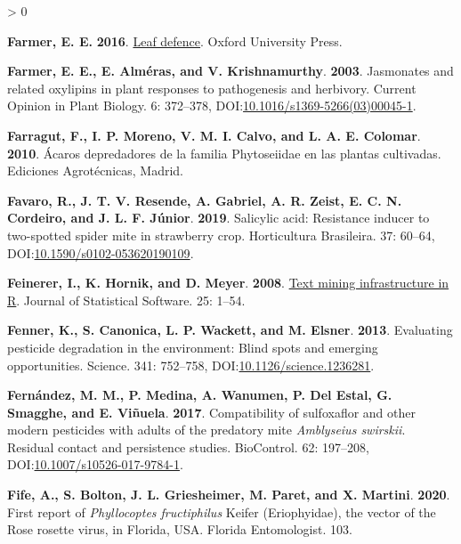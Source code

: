 \documentclass{ufdissertation}[overrideChapters] %
\newlength{\cslhangindent}
\newenvironment{CSLReferences}[2] %
 {%
  \setlength{\parindent}{0pt}
  \ifodd #1 \everypar{\setlength{\hangindent}{\cslhangindent}}\ignorespaces\fi
  \ifnum #2 > 0
  \setlength{\parskip}{#2\baselineskip}
  \fi
 }%
 {}
\begin{document}
{\begin{CSLReferences}{1}{1}
\leavevmode{}%
\textbf{Farmer, E. E.} \textbf{2016}. \href{https://www.ebook.de/de/product/28782938/edward_e_farmer_leaf_defence.html}{Leaf defence}. Oxford University Press.

\leavevmode{}%
\textbf{Farmer, E. E., E. Alméras, and V. Krishnamurthy}. \textbf{2003}. Jasmonates and related oxylipins in plant responses to pathogenesis and herbivory. Current Opinion in Plant Biology. 6: 372--378, DOI:\href{https://doi.org/10.1016/s1369-5266(03)00045-1}{10.1016/s1369-5266(03)00045-1}.

\leavevmode{}%
\textbf{Farragut, F., I. P. Moreno, V. M. I. Calvo, and L. A. E. Colomar}. \textbf{2010}. {Á}caros depredadores de la familia {Phytoseiidae} en las plantas cultivadas. Ediciones Agrot{é}cnicas, Madrid.

\leavevmode{}%
\textbf{Favaro, R., J. T. V. Resende, A. Gabriel, A. R. Zeist, E. C. N. Cordeiro, and J. L. F. Júnior}. \textbf{2019}. Salicylic acid: Resistance inducer to two-spotted spider mite in strawberry crop. Horticultura Brasileira. 37: 60--64, DOI:\href{https://doi.org/10.1590/s0102-053620190109}{10.1590/s0102-053620190109}.

\leavevmode{}%
\textbf{Feinerer, I., K. Hornik, and D. Meyer}. \textbf{2008}. \href{https://www.jstatsoft.org/v25/i05/}{Text mining infrastructure in {R}}. Journal of Statistical Software. 25: 1--54.

\leavevmode{}%
\textbf{Fenner, K., S. Canonica, L. P. Wackett, and M. Elsner}. \textbf{2013}. Evaluating pesticide degradation in the environment: Blind spots and emerging opportunities. Science. 341: 752--758, DOI:\href{https://doi.org/10.1126/science.1236281}{10.1126/science.1236281}.

\leavevmode{}%
\textbf{Fernández, M. M., P. Medina, A. Wanumen, P. Del Estal, G. Smagghe, and E. Viñuela}. \textbf{2017}. Compatibility of sulfoxaflor and other modern pesticides with adults of the predatory mite {\emph{Amblyseius swirskii}}. Residual contact and persistence studies. {BioControl}. 62: 197--208, DOI:\href{https://doi.org/10.1007/s10526-017-9784-1}{10.1007/s10526-017-9784-1}.

\leavevmode{}%
\textbf{Fife, A., S. Bolton, J. L. Griesheimer, M. Paret, and X. Martini}. \textbf{2020}. First report of {\emph{Phyllocoptes fructiphilus}} {Keifer} ({Eriophyidae}), the vector of the {Rose rosette virus}, in {Florida}, {USA}. Florida Entomologist. 103.


\end{CSLReferences}}
\end{document}

